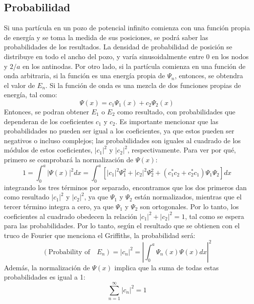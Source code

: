 \documentclass[12pt,twoside]{extarticle}
\begin{document}
\subsection{Probabilidad}
Si una partícula en un pozo de potencial infinito comienza con una función propia de energía y se toma la medida de sus posiciones, se podrá saber las probabilidades de los resultados.
La densidad de probabilidad de posición se distribuye en todo el ancho del pozo, y varía sinusoidalmente entre 0 en los nodos y $2/a$ en los antinodas.
Por otro lado, si la partícula comienza en una función de onda arbitraria, si la función es una energía propia de $\Psi_n$, entonces, se obtendra el valor de $E_n$.
Si la función de onda es una mezcla de dos funciones propias de energía, tal como:
\begin{equation}
    \Psi(x)=c_1\Psi_1(x)+c_2\Psi_2(x)
\end{equation}
Entonces, se podran obtener $E_1$ o $E_2$ como resultado, con probabilidades que dependeran de los coeficientes $c_1$ y $c_2$. Es importante mencionar que las probabilidades no pueden ser igual a los coeficientes, ya que estos pueden ser negativos o incluso complejos; las probabilidades son iguales al cuadrado de los módulos de estos coeficientes, $|c_1|^2$ y $|c_2|^2$, respectivamente. Para ver por qué, primero se comprobará la normalización de $\Psi(x)$:
\begin{equation}
    1=\int_{0}^{a}|\Psi(x)|^2dx=\int_{0}^{a}[|c_1|^2\Psi_{1}^{2}+|c_2|^2\Psi_{2}^{2}+(c_1^*c_2+c_2^*c_1)\Psi_1\Psi_2]dx
\end{equation}
integrando los tres términos por separado, encontramos que los dos primeros dan como resultado $|c_1|^2$ y $|c_2|^2$, ya que $\Psi_1$ y $\Psi_2$ están normalizados, mientras que el tercer término integra a cero, ya que $\Psi_1$ y $\Psi_2$ son ortogonales. Por lo tanto, los coeficientes al cuadrado obedecen la relación $|c_1|^2+|c_2|^2=1$, tal como se espera para las probabilidades.
Por lo tanto, según el resultado que se obtienen con el truco de Fourier que menciona el Griffiths, la probabilidad será:
\begin{equation}
    (\text{Probability of}\quad E_n)=|c_n|^2=|\int_{0}^{a}\Psi_n(x)\Psi(x)dx|^2
\end{equation}
Además, la normalización de $\Psi(x)$ implica que la suma de todas estas probabilidades es igual a 1:
\begin{equation}
    \sum_{n=1}^{\infty}|c_n|^2=1
\end{equation}
\end{document}
